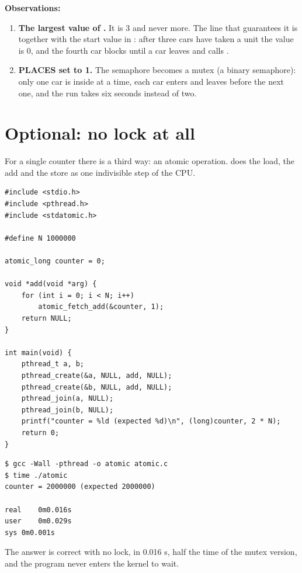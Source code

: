 \documentclass[11pt,a4paper]{article}
\begin{document}
\textbf{Observations:}
\begin{enumerate}
  \item \textbf{The largest value of .} It is 3 and never more. The line that
  guarantees it is  together with the start value in
  : after three cars have taken a unit the value is 0, and
  the fourth car blocks until a car leaves and calls .
  \item \textbf{PLACES set to 1.} The semaphore becomes a mutex (a binary semaphore): only one
  car is inside at a time, each car enters and leaves before the next one, and the run takes
  six seconds instead of two.
\end{enumerate}

\section{Optional: no lock at all}

For a single counter there is a third way: an atomic operation.  does
the load, the add and the store as one indivisible step of the CPU.

\begin{lstlisting}[style=ccode,caption={atomic.c}]
#include <stdio.h>
#include <pthread.h>
#include <stdatomic.h>

#define N 1000000

atomic_long counter = 0;

void *add(void *arg) {
    for (int i = 0; i < N; i++)
        atomic_fetch_add(&counter, 1);
    return NULL;
}

int main(void) {
    pthread_t a, b;
    pthread_create(&a, NULL, add, NULL);
    pthread_create(&b, NULL, add, NULL);
    pthread_join(a, NULL);
    pthread_join(b, NULL);
    printf("counter = %ld (expected %d)\n", (long)counter, 2 * N);
    return 0;
}
\end{lstlisting}

\begin{lstlisting}[caption={atomic: correct and faster than the mutex}]
$ gcc -Wall -pthread -o atomic atomic.c
$ time ./atomic
counter = 2000000 (expected 2000000)

real	0m0.016s
user	0m0.029s
sys	0m0.001s
\end{lstlisting}

The answer is correct with no lock, in 0.016 s, half the time of the mutex version, and the
program never enters the kernel to wait.
\end{document}

